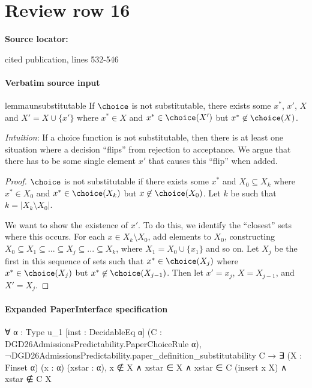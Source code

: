 \documentclass[10pt]{article}
\begin{document}
\section*{Review row 16}
\textbf{Source locator:} {\footnotesize\raggedright cited publication, lines 532-\allowbreak{}546\par}
\paragraph{Verbatim source input}
\begin{ReviewVerbatim}
\begin{restatable}{lemma}{unsubstitutable}
\label{lem:unsubstitutable}
If $\choice$ is not substitutable, there exists some $x^*$, $x'$, $X$ and $X' = X \cup \{x'\}$ where $x^* \in X$ and $x^* \in \choice(X')$ but $x^* \not\in \choice(X)$.
\end{restatable}

\textit{Intuition}:
If a choice function is not substitutable, then there is at least one situation where a decision ``flips'' from rejection to acceptance.
We argue that there has to be some single element $x'$ that causes this ``flip'' when added.

\begin{proof}
$\choice$ is not substitutable if there exists some  $x^*$ and $X_0 \subseteq X_k$ where $x^* \in X_0$ and $x^* \in \choice(X_k)$ but $x \not\in \choice(X_0)$.
Let $k$ be such that $k = |X_k \setminus X_0|$.%

We want to show the existence of $x'$. To do this, we identify the ``closest'' sets where this occurs. For each $x \in X_k \setminus X_0$, add elements to $X_0$, constructing $X_0 \subseteq X_1 \subseteq ... \subseteq X_j \subseteq ... \subseteq X_k$, where $X_1 = X_0 \cup \{x_1\}$ and so on. Let $X_j$ be the first in this sequence of sets such that $x^* \in \choice(X_j)$ where $x^* \in \choice(X_j)$ but $x^* \not\in \choice(X_{j-1})$. Then let $x' = x_j$, $X = X_{j-1}$, and $X' = X_j$.
\end{proof}
\end{ReviewVerbatim}



\paragraph{Expanded PaperInterface specification}
\begin{ReviewVerbatim}
∀ {α : Type u_1} [inst : DecidableEq α] (C : DGD26AdmissionsPredictability.PaperChoiceRule α),
  ¬DGD26AdmissionsPredictability.paper_definition_substitutability C →
    ∃ (X : Finset α) (x : α) (xstar : α), x ∉ X ∧ xstar ∈ X ∧ xstar ∈ C (insert x X) ∧ xstar ∉ C X
\end{ReviewVerbatim}
\end{document}
